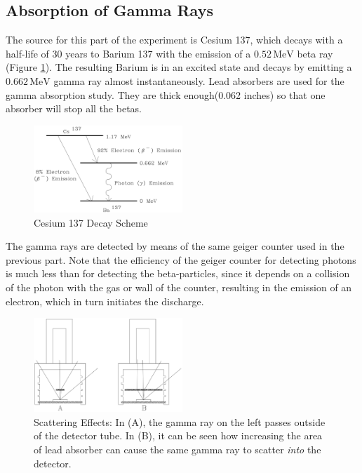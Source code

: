 \subsection{Absorption of Gamma Rays}
The source for this part of the experiment is Cesium 137, which decays with a half-life of 30 years to Barium 137 with the emission of a $0.52\, \mathrm{MeV}$ beta ray (Figure {\ref{fig:cesium}}). The resulting Barium is in an excited state and decays by emitting a $0.662\, \mathrm{MeV}$ gamma ray almost instantaneously. Lead absorbers are used for the gamma absorption study. They are thick enough(0.062 inches) so that one absorber will stop all the betas.\myskip
\begin{figure}[h]
\centering
\includegraphics[width=0.5\textwidth]{./Exp10/pic/image9.png}
\caption{Cesium 137 Decay Scheme}
\label{fig:cesium}
\end{figure}

The gamma rays are detected by means of the same geiger counter used in the previous part. Note that the efficiency of the geiger counter for detecting photons is much less than for detecting the beta-particles, since it depends on a collision of the photon with the gas or wall of the counter, resulting in the emission of an electron, which in turn initiates the discharge.\myskip
\begin{figure}[h]
\centering
\includegraphics[width=0.5\textwidth]{./Exp10/pic/image10.png}
\caption{Scattering Effects: In (A), the gamma ray on the left passes outside of the detector tube. In (B), it can be seen how increasing the area of lead absorber can cause the same gamma ray to scatter \emph{into} the detector.}
\label{fig:scattering}
\end{figure}

